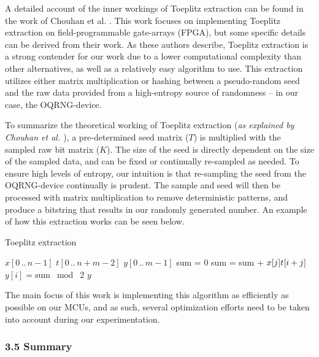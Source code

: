A detailed account of the inner workings of Toeplitz extraction can be found in the work of Chouhan et al. \cite{toeplitz-desc}. This work focuses on implementing Toeplitz extraction on field-programmable gate-arrays (FPGA), but some specific details can be derived from their work. As these authors describe, Toeplitz extraction is a strong contender for our work due to a lower computational complexity than other alternatives, as well as a relatively easy algorithm to use. This extraction utilizes either matrix multiplication or hashing between a pseudo-random seed and the raw data provided from a high-entropy source of randomness -- in our case, the OQRNG-device.

To summarize the theoretical working of Toeplitz extraction (\emph{as explained by Chouhan et al. \cite{toeplitz-desc}}), a pre-determined seed matrix (\(T\)) is multiplied with the sampled raw bit matrix (\(K\)). The size of the seed is directly dependent on the size of the sampled data, and can be fixed or continually re-sampled as needed. To ensure high levels of entropy, our intuition is that re-sampling the seed from the OQRNG-device continually is prudent. The sample and seed will then be processed with matrix multiplication to remove deterministic patterns, and produce a bitstring that results in our randomly generated number. An example of how this extraction works can be seen below.

\begin{algorithm}[ht] \caption{Toeplitz extraction}\label{alg:bit-conv}
\begin{algorithmic}[1] \REQUIRE \(x[0\,..\,n-1]\)  \REQUIRE \(t[0\,..\,n+m-2]\)  \ENSURE \(y[0\,..\,m-1]\) 
 \STATE sum = 0  \STATE
sum = sum + \(x[j] \* t[i + j]\) \ENDFOR \STATE \(y[i] =
\mathrm{sum}\;\bmod\;2\) \ENDFOR \RETURN \(y\) \end{algorithmic} \end{algorithm}

The main focus of this work is implementing this algorithm as efficiently as possible on our MCUs, and as such, several optimization efforts need to be taken into account during our experimentation.

\hypertarget{summary}{%
\subsubsection{3.5 Summary}\label{summary}}

